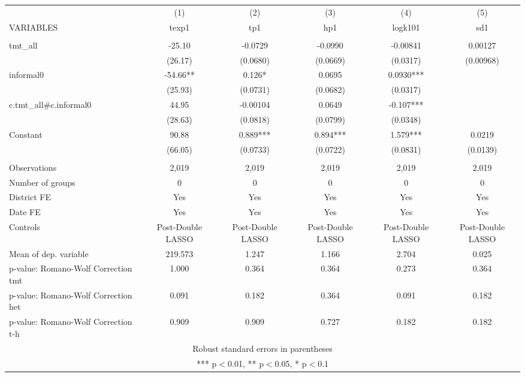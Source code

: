 \documentclass[]{article}
\begin{document}
\begin{tabular}{lccccc} \hline
 & (1) & (2) & (3) & (4) & (5) \\
VARIABLES & texp1 & tp1 & hp1 & logk101 & sd1 \\ \hline
 &  &  &  &  &  \\
tmt\_all & -25.10 & -0.0729 & -0.0990 & -0.00841 & 0.00127 \\
 & (26.17) & (0.0680) & (0.0669) & (0.0317) & (0.00968) \\
informal0 & -54.66** & 0.126* & 0.0695 & 0.0930*** &  \\
 & (25.93) & (0.0731) & (0.0682) & (0.0317) &  \\
c.tmt\_all\#c.informal0 & 44.95 & -0.00104 & 0.0649 & -0.107*** &  \\
 & (28.63) & (0.0818) & (0.0799) & (0.0348) &  \\
Constant & 90.88 & 0.889*** & 0.894*** & 1.579*** & 0.0219 \\
 & (66.05) & (0.0733) & (0.0722) & (0.0831) & (0.0139) \\
 &  &  &  &  &  \\
Observations & 2,019 & 2,019 & 2,019 & 2,019 & 2,019 \\
Number of groups & 0 & 0 & 0 & 0 & 0 \\
District FE & Yes & Yes & Yes & Yes & Yes \\
Date FE & Yes & Yes & Yes & Yes & Yes \\
Controls & Post-Double LASSO & Post-Double LASSO & Post-Double LASSO & Post-Double LASSO & Post-Double LASSO \\
Mean of dep. variable & 219.573 & 1.247 & 1.166 & 2.704 & 0.025 \\
p-value: Romano-Wolf Correction tmt & 1.000 & 0.364 & 0.364 & 0.273 & 0.364 \\
p-value: Romano-Wolf Correction het & 0.091 & 0.182 & 0.364 & 0.091 & 0.182 \\
 p-value: Romano-Wolf Correction t-h & 0.909 & 0.909 & 0.727 & 0.182 & 0.182 \\ \hline
\multicolumn{6}{c}{ Robust standard errors in parentheses} \\
\multicolumn{6}{c}{ *** p$<$0.01, ** p$<$0.05, * p$<$0.1} \\
\end{tabular}
\end{document}
